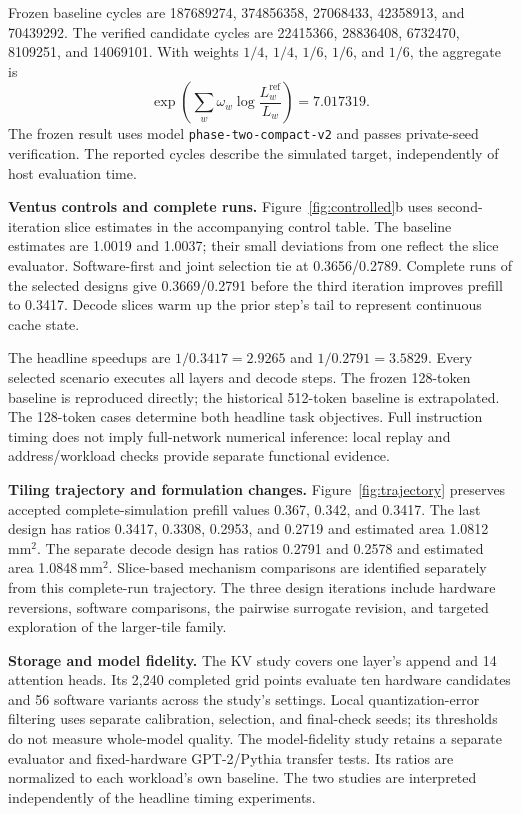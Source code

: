 Frozen baseline cycles are 187689274, 374856358, 27068433, 42358913, and 70439292. The verified candidate cycles are 22415366, 28836408, 6732470, 8109251, and 14069101. With weights $1/4$, $1/4$, $1/6$, $1/6$, and $1/6$, the aggregate is
\[
 \exp\!\left(\sum_w \omega_w\log\frac{L_w^{\mathrm{ref}}}{L_w}\right)=7.017319.
\]
The frozen result uses model \texttt{phase-two-compact-v2} and passes private-seed verification. The reported cycles describe the simulated target, independently of host evaluation time.

\textbf{Ventus controls and complete runs.}
Figure~\ref{fig:controlled}b uses second-iteration slice estimates in the accompanying control table. The baseline estimates are 1.0019 and 1.0037; their small deviations from one reflect the slice evaluator. Software-first and joint selection tie at 0.3656/0.2789. Complete runs of the selected designs give 0.3669/0.2791 before the third iteration improves prefill to 0.3417. Decode slices warm up the prior step's tail to represent continuous cache state.

The headline speedups are $1/0.3417=2.9265$ and $1/0.2791=3.5829$. Every selected scenario executes all layers and decode steps. The frozen 128-token baseline is reproduced directly; the historical 512-token baseline is extrapolated. The 128-token cases determine both headline task objectives. Full instruction timing does not imply full-network numerical inference: local replay and address/workload checks provide separate functional evidence.

\textbf{Tiling trajectory and formulation changes.}
Figure~\ref{fig:trajectory} preserves accepted complete-simulation prefill values 0.367, 0.342, and 0.3417. The last design has ratios 0.3417, 0.3308, 0.2953, and 0.2719 and estimated area 1.0812\,mm$^2$. The separate decode design has ratios 0.2791 and 0.2578 and estimated area 1.0848\,mm$^2$. Slice-based mechanism comparisons are identified separately from this complete-run trajectory. The three design iterations include hardware reversions, software comparisons, the pairwise surrogate revision, and targeted exploration of the larger-tile family.

\textbf{Storage and model fidelity.}
The KV study covers one layer's append and 14 attention heads. Its 2,240 completed grid points evaluate ten hardware candidates and 56 software variants across the study's settings. Local quantization-error filtering uses separate calibration, selection, and final-check seeds; its thresholds do not measure whole-model quality. The model-fidelity study retains a separate evaluator and fixed-hardware GPT-2/Pythia transfer tests. Its ratios are normalized to each workload's own baseline. The two studies are interpreted independently of the headline timing experiments.
